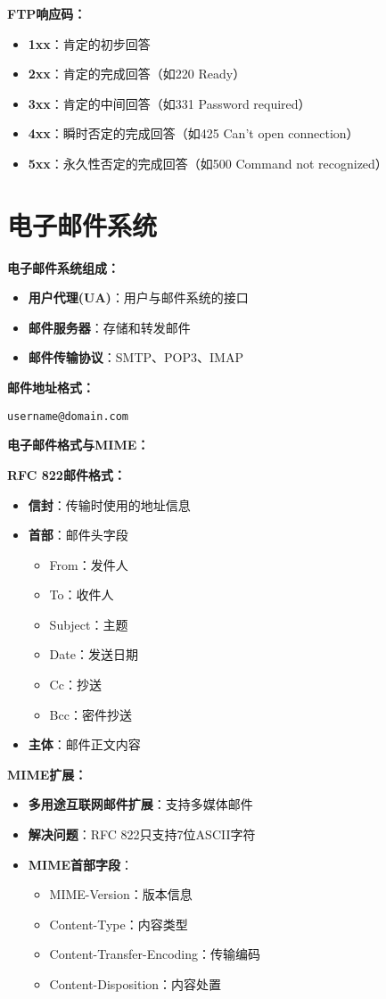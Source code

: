 \documentclass[lang=cn,newtx,10pt,scheme=chinese]{../../elegantbook}
\begin{document}
\textbf{FTP响应码：}
\begin{itemize}
  \item \textbf{1xx}：肯定的初步回答
  \item \textbf{2xx}：肯定的完成回答（如220 Ready）
  \item \textbf{3xx}：肯定的中间回答（如331 Password required）
  \item \textbf{4xx}：瞬时否定的完成回答（如425 Can't open connection）
  \item \textbf{5xx}：永久性否定的完成回答（如500 Command not recognized）
\end{itemize}

\section{电子邮件系统}

\textbf{电子邮件系统组成：}
\begin{itemize}
  \item \textbf{用户代理(UA)}：用户与邮件系统的接口
  \item \textbf{邮件服务器}：存储和转发邮件
  \item \textbf{邮件传输协议}：SMTP、POP3、IMAP
\end{itemize}

\textbf{邮件地址格式：}
\begin{center}
\texttt{username@domain.com}
\end{center}

\textbf{电子邮件格式与MIME：}

\textbf{RFC 822邮件格式：}
\begin{itemize}
  \item \textbf{信封}：传输时使用的地址信息
  \item \textbf{首部}：邮件头字段
    \begin{itemize}
      \item From：发件人
      \item To：收件人
      \item Subject：主题
      \item Date：发送日期
      \item Cc：抄送
      \item Bcc：密件抄送
    \end{itemize}
  \item \textbf{主体}：邮件正文内容
\end{itemize}

\textbf{MIME扩展：}
\begin{itemize}
  \item \textbf{多用途互联网邮件扩展}：支持多媒体邮件
  \item \textbf{解决问题}：RFC 822只支持7位ASCII字符
  \item \textbf{MIME首部字段}：
    \begin{itemize}
      \item MIME-Version：版本信息
      \item Content-Type：内容类型
      \item Content-Transfer-Encoding：传输编码
      \item Content-Disposition：内容处置
    \end{itemize}
\end{itemize}
\end{document}
